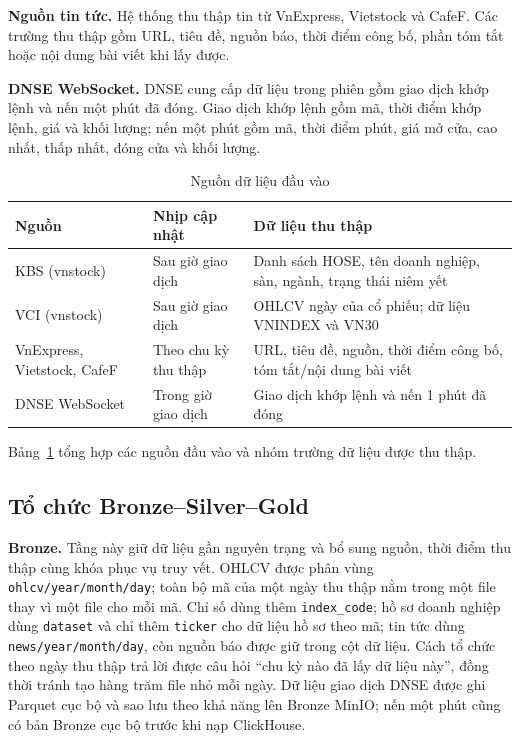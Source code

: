\documentclass[conference,a4paper]{IEEEtran}
\newcommand{\code}[1]{\texttt{#1}}
\begin{document}
\textbf{Nguồn tin tức.} Hệ thống thu thập tin từ VnExpress, Vietstock và CafeF. Các trường thu thập gồm URL, tiêu đề, nguồn báo, thời điểm công bố, phần tóm tắt hoặc nội dung bài viết khi lấy được.

\textbf{DNSE WebSocket.} DNSE cung cấp dữ liệu trong phiên gồm giao dịch khớp lệnh và nến một phút đã đóng. Giao dịch khớp lệnh gồm mã, thời điểm khớp lệnh, giá và khối lượng; nến một phút gồm mã, thời điểm phút, giá mở cửa, cao nhất, thấp nhất, đóng cửa và khối lượng.
 

\begin{table}[t]
\caption{Nguồn dữ liệu đầu vào}
\label{tab:sources}
\centering
\scriptsize
\begin{tabular}{p{1.5cm}p{2.3cm}p{3.2cm}}
\toprule
\textbf{Nguồn} & \textbf{Nhịp cập nhật} & \textbf{Dữ liệu thu thập} \\
\midrule
KBS (vnstock) & Sau giờ giao dịch & Danh sách HOSE, tên doanh nghiệp, sàn, ngành, trạng thái niêm yết \\
VCI (vnstock) & Sau giờ giao dịch & OHLCV ngày của cổ phiếu; dữ liệu VNINDEX và VN30 \\
VnExpress, Vietstock, CafeF & Theo chu kỳ thu thập & URL, tiêu đề, nguồn, thời điểm công bố, tóm tắt/nội dung bài viết \\
DNSE WebSocket & Trong giờ giao dịch & Giao dịch khớp lệnh và nến 1 phút đã đóng \\
\bottomrule
\end{tabular}
\end{table}

Bảng~\ref{tab:sources} tổng hợp các nguồn đầu vào và nhóm trường dữ liệu được thu thập.

\subsection{Tổ chức Bronze--Silver--Gold}

\textbf{Bronze.} Tầng này giữ dữ liệu gần nguyên trạng và bổ sung nguồn, thời điểm thu thập cùng khóa phục vụ truy vết. OHLCV được phân vùng \code{ohlcv/year/month/day}; toàn bộ mã của một ngày thu thập nằm trong một file thay vì một file cho mỗi mã. Chỉ số dùng thêm \code{index\_code}; hồ sơ doanh nghiệp dùng \code{dataset} và chỉ thêm \code{ticker} cho dữ liệu hồ sơ theo mã; tin tức dùng \code{news/year/month/day}, còn nguồn báo được giữ trong cột dữ liệu. Cách tổ chức theo ngày thu thập trả lời được câu hỏi ``chu kỳ nào đã lấy dữ liệu này'', đồng thời tránh tạo hàng trăm file nhỏ mỗi ngày. Dữ liệu giao dịch DNSE được ghi Parquet cục bộ và sao lưu theo khả năng lên Bronze MinIO; nến một phút cũng có bản Bronze cục bộ trước khi nạp ClickHouse.
\end{document}
